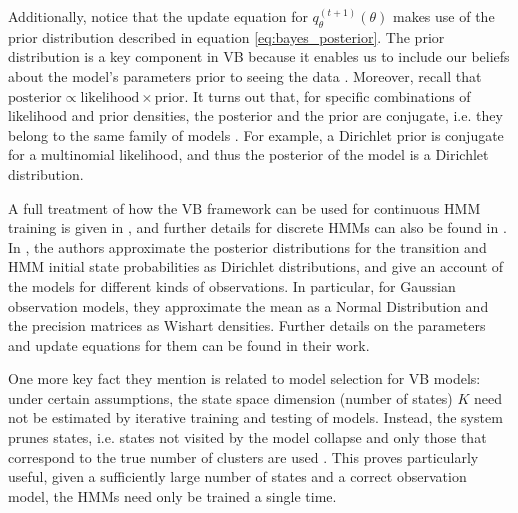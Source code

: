 \documentclass[../main.tex]{subfiles}
\begin{document}
\par Additionally, notice that the update equation for $q_{\theta}^{(t+1)}(\theta)$ makes use of the prior distribution described in equation \ref{eq:bayes_posterior}. The prior distribution is a key component in VB because it enables us to include our beliefs about the model's parameters prior to seeing the data \cite{Genovese2004}. Moreover, recall that $\text{posterior} \propto \text{likelihood} \times \text{prior}$. It turns out that, for specific combinations of likelihood and prior densities, the posterior and the prior are conjugate, i.e. they belong to the same family of models \cite{Rezek2005}. For example, a Dirichlet prior is conjugate for a multinomial likelihood, and thus the posterior of the model is a Dirichlet distribution. 
\par A full treatment of how the VB framework can be used for continuous HMM training is given in \cite{Rezek2005}, and further details for discrete HMMs can also be found in \cite{Beal2001,MacKay1997}. In \cite{Rezek2005}, the authors approximate the posterior distributions for the transition and HMM initial state probabilities as Dirichlet distributions, and give an account of the models for different kinds of observations. In particular, for Gaussian observation models, they approximate the mean as a Normal Distribution and the precision matrices as Wishart densities. Further details on the parameters and update equations for them can be found in their work.
\par One more key fact they mention is related to model selection for VB models: under certain assumptions, the state space dimension (number of states) $K$ need not be estimated by iterative training and testing of models. Instead, the system prunes states, i.e. states not visited by the model collapse and only those that correspond to the true number of clusters are used \cite{Rezek2005}. This proves particularly useful, given a sufficiently large number of states and a correct observation model, the HMMs need only be trained a single time.
\end{document}
